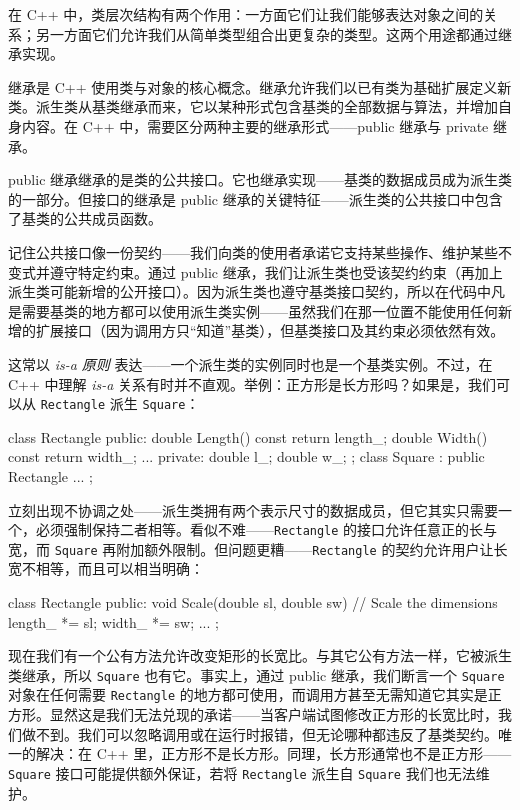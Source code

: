 在 C++ 中，类层次结构有两个作用：一方面它们让我们能够表达对象之间的关系；另一方面它们允许我们从简单类型组合出更复杂的类型。这两个用途都通过继承实现。

继承是 C++ 使用类与对象的核心概念。继承允许我们以已有类为基础扩展定义新类。派生类从基类继承而来，它以某种形式包含基类的全部数据与算法，并增加自身内容。在 C++ 中，需要区分两种主要的继承形式——public 继承与 private 继承。

public 继承继承的是类的公共接口。它也继承实现——基类的数据成员成为派生类的一部分。但接口的继承是 public 继承的关键特征——派生类的公共接口中包含了基类的公共成员函数。

记住公共接口像一份契约——我们向类的使用者承诺它支持某些操作、维护某些不变式并遵守特定约束。通过 public 继承，我们让派生类也受该契约约束（再加上派生类可能新增的公开接口）。因为派生类也遵守基类接口契约，所以在代码中凡是需要基类的地方都可以使用派生类实例——虽然我们在那一位置不能使用任何新增的扩展接口（因为调用方只“知道”基类），但基类接口及其约束必须依然有效。

这常以 \emph{is-a 原则} 表达——一个派生类的实例同时也是一个基类实例。不过，在 C++ 中理解 \emph{is-a} 关系有时并不直观。举例：正方形是长方形吗？如果是，我们可以从 \texttt{Rectangle} 派生 \texttt{Square}：

\begin{code}
class Rectangle {
  public:
  double Length() const { return length_; }
  double Width()  const { return width_; }
  ...
  private:
  double l_;
  double w_;
};
class Square : public Rectangle {
  ...
};
\end{code}

立刻出现不协调之处——派生类拥有两个表示尺寸的数据成员，但它其实只需要一个，必须强制保持二者相等。看似不难——\texttt{Rectangle} 的接口允许任意正的长与宽，而 \texttt{Square} 再附加额外限制。但问题更糟——\texttt{Rectangle} 的契约允许用户让长宽不相等，而且可以相当明确：

\begin{code}
class Rectangle {
  public:
  void Scale(double sl, double sw) {
     // Scale the dimensions
    length_ *= sl;
    width_  *= sw;
  }
  ...
};
\end{code}

现在我们有一个公有方法允许改变矩形的长宽比。与其它公有方法一样，它被派生类继承，所以 \texttt{Square} 也有它。事实上，通过 public 继承，我们断言一个 \texttt{Square} 对象在任何需要 \texttt{Rectangle} 的地方都可使用，而调用方甚至无需知道它其实是正方形。显然这是我们无法兑现的承诺——当客户端试图修改正方形的长宽比时，我们做不到。我们可以忽略调用或在运行时报错，但无论哪种都违反了基类契约。唯一的解决：在 C++ 里，正方形不是长方形。同理，长方形通常也不是正方形——\texttt{Square} 接口可能提供额外保证，若将 \texttt{Rectangle} 派生自 \texttt{Square} 我们也无法维护。

